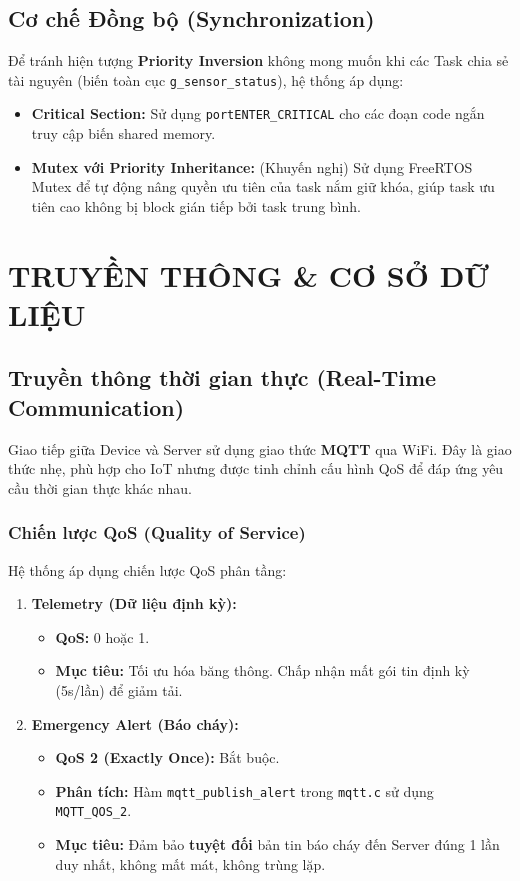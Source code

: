 \documentclass[12pt,a4paper]{report}
\begin{document}
\section{Cơ chế Đồng bộ (Synchronization)}
Để tránh hiện tượng \textbf{Priority Inversion} không mong muốn khi các Task chia sẻ tài nguyên (biến toàn cục \texttt{g\_sensor\_status}), hệ thống áp dụng:
\begin{itemize}
    \item \textbf{Critical Section:} Sử dụng \texttt{portENTER\_CRITICAL} cho các đoạn code ngắn truy cập biến shared memory.
    \item \textbf{Mutex với Priority Inheritance:} (Khuyến nghị) Sử dụng FreeRTOS Mutex để tự động nâng quyền ưu tiên của task nắm giữ khóa, giúp task ưu tiên cao không bị block gián tiếp bởi task trung bình.
\end{itemize}

\chapter{TRUYỀN THÔNG \& CƠ SỞ DỮ LIỆU}

\section{Truyền thông thời gian thực (Real-Time Communication)}
Giao tiếp giữa Device và Server sử dụng giao thức \textbf{MQTT} qua WiFi. Đây là giao thức nhẹ, phù hợp cho IoT nhưng được tinh chỉnh cấu hình QoS để đáp ứng yêu cầu thời gian thực khác nhau.

\subsection{Chiến lược QoS (Quality of Service)}
Hệ thống áp dụng chiến lược QoS phân tầng:

\begin{enumerate}
    \item \textbf{Telemetry (Dữ liệu định kỳ):}
    \begin{itemize}
        \item \textbf{QoS:} 0 hoặc 1.
        \item \textbf{Mục tiêu:} Tối ưu hóa băng thông. Chấp nhận mất gói tin định kỳ (5s/lần) để giảm tải.
    \end{itemize}
    
    \item \textbf{Emergency Alert (Báo cháy):}
    \begin{itemize}
        \item \textbf{QoS 2 (Exactly Once):} Bắt buộc.
        \item \textbf{Phân tích:} Hàm \texttt{mqtt\_publish\_alert} trong \texttt{mqtt.c} sử dụng \texttt{MQTT\_QOS\_2}.
        \item \textbf{Mục tiêu:} Đảm bảo \textbf{tuyệt đối} bản tin báo cháy đến Server đúng 1 lần duy nhất, không mất mát, không trùng lặp.
    \end{itemize}
\end{enumerate}
\end{document}
